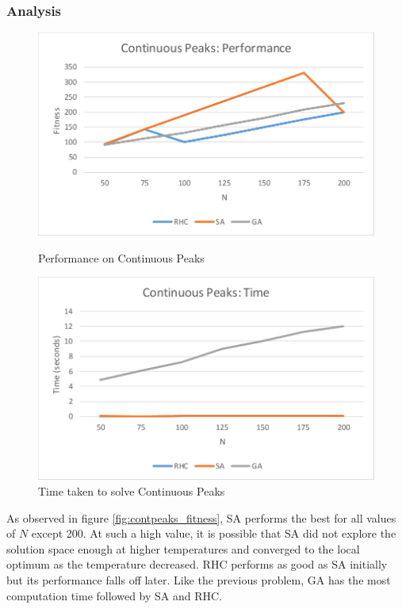 \documentclass[letterpaper]{article}
\begin{document}
	\subsubsection{Analysis}
	\begin{figure}
		\centering
		\begin{minipage}{.5\textwidth}
			\centering
			\includegraphics[width=\linewidth]{../plots/continuouspeaks_fitness}
			\caption{Performance on Continuous Peaks}
			\label{fig:contpeaks_fitness}
		\end{minipage}%
		\begin{minipage}{.5\textwidth}
			\centering
			\includegraphics[width=\linewidth]{../plots/continuouspeaks_time}
			\caption{Time taken to solve Continuous Peaks}
			\label{fig:contpeaks_time}			
		\end{minipage}
	\end{figure}
	As observed in figure \ref{fig:contpeaks_fitness}, SA performs the best for all values of $N$ except 200. At such a high value, it is possible that SA did not explore the solution space enough at higher temperatures and converged to the local optimum as the temperature decreased. RHC performs as good as SA initially but its performance falls off later. Like the previous problem, GA has the most computation time followed by SA and RHC.
	
\end{document}
